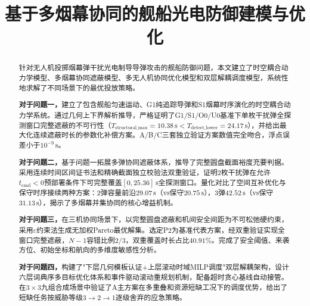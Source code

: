 \documentclass[withoutpreface,bwprint]{cumcmthesis}
\title{基于多烟幕协同的舰船光电防御建模与优化}  %
\renewcommand{\textbf}[1]{{\song\bfseries #1}}
\begin{document}
	
\maketitle
\begin{abstract}

针对无人机投掷烟幕弹干扰光电制导导弹攻击的舰船防御问题，本文建立了时空耦合动力学模型、多烟幕协同遮蔽模型、多无人机协同优化模型和双层解耦调度模型，系统性地求解了不同场景下的最优投放策略。

\textbf{对于问题一，}建立了包含舰船匀速运动、G1纯追踪导弹和S1烟幕时序演化的时空耦合动力学系统。通过几何上下界解析推导，严格证明了G1/S1/O0/U0基准下单枚干扰弹全探测窗口完整遮蔽的不可行性（$T_{\text{structural\_max}}=10.38\,\text{s}<T_{\text{detect\_lower}}=24.17\,\text{s}$），并给出最大化连续遮蔽时长的参数化补偿方案。A/B/C三套独立验证方案数值完全吻合，浮点误差小于$10^{-9}\,\text{s}$。

\textbf{对于问题二，}基于问题一拓展多弹协同遮蔽体系，推导了完整圆盘截面裕度充要判据。采用连续时间区间证书法和精确截面独立校验法双重验证，证明2枚干扰弹在允许$t_{\text{cmd}}<0$预部署条件下可完整覆盖$[0,25.36]\,\text{s}$全探测窗口。量化对比了空间互补优化与保守时序接续两种方案：2弹容量前沿$29.07\,\text{s}$（vs保守$20.75\,\text{s}$），3弹$42.52\,\text{s}$（vs保守$31.13\,\text{s}$），揭示了多烟幕并集协同的核心增益机制。

\textbf{对于问题三，}在三机协同场景下，以完整圆盘遮蔽和机间安全间距为不可松弛硬约束，采用$\varepsilon$约束法生成无加权Pareto最优解集。选定P2为基准代表方案，经双重验证实现全窗口完整遮蔽，$N-1$容错比例$2/3$，双重覆盖时长占比$40.91\%$。完成了安全阈值、来袭方位、初始坐标和航向的多维度敏感性分析。

\textbf{对于问题四，}构建了"下层几何模板认证+上层滚动时域MILP调度"双层解耦架构，设计六层词典序多目标优化体系和事件驱动滚动重规划机制，配备超时贪心基线自动接管。在$3\times3$九组合成场景中验证了A主方案在多重叠和资源短缺工况下的调度优势，给出了短缺任务按威胁等级$3\to2\to1$逐级舍弃的应急策略。


\end{abstract}




\vspace{-1.4cm} 
\end{document}
